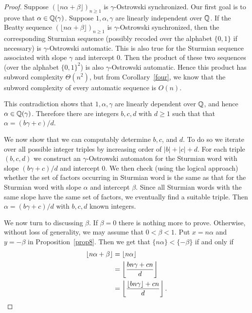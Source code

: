 \documentclass[12pt,reqno]{article}
\begin{document}
\begin{proof}
Suppose 
  $(\lfloor n \alpha + \beta \rfloor)_{n \geq 1}$ is $\gamma$-Ostrowski synchronized.
Our first goal is to prove that $\alpha \in \mathbb{Q}(\gamma)$.
Suppose $1,\alpha,\gamma$ are
linearly independent over $\mathbb{Q}$.
If the Beatty sequence
  $(\lfloor n \alpha + \beta \rfloor)_{n \geq 1}$ is $\gamma$-Ostrowski synchronized, then
the corresponding Sturmian sequence
(possibly recoded over the alphabet
$\{0,1\}$ if necessary) is $\gamma$-Ostrowski automatic.  
This is also true for the Sturmian
sequence associated with slope $\gamma$ and intercept $0$.   Then the product of these two sequences
(over the alphabet $\{0,1\}^2$)
is also $\gamma$-Ostrowski automatic.   Hence this product
has subword complexity $\Theta(n^2)$, but 
from Corollary~\ref{four},
we know that the subword complexity of every automatic sequence is $O(n)$.  

This contradiction shows that $1,\alpha,\gamma$ are linearly dependent over $\mathbb{Q}$, and hence $\alpha \in \mathbb{Q}(\gamma)$.  Therefore there are
integers $b,c,d$ with $d \geq 1$ such that that
$\alpha = (b\gamma + c)/d$.

We now show that we can computably determine $b,c$, and $d$.  To do so we iterate over all possible integer triples by increasing order of $|b|+|c|+d$.
For each triple $(b,c,d)$ we construct an $\gamma$-Ostrowski automaton for the Sturmian word with slope $(b\gamma+c)/d$ and intercept $0$.   We then check 
(using the logical approach) whether the set of factors occurring in Sturmian word is the same as that for the Sturmian word with slope $\alpha$ and intercept $\beta$.  Since all Sturmian words with the same slope have the same set of factors, we eventually find a suitable triple.  
Then $\alpha = (b\gamma+c)/d$ with $b, c, d$ known integers.  

We now turn to discussing $\beta$.
If $\beta = 0$ there is nothing more to prove.
Otherwise, without loss of generality, we may assume that
$0 < \beta < 1$.  
Put $x = n \alpha$ and $y = -\beta$ in
Proposition~\ref{prop8}.
Then we get that $\{n \alpha \} < \{-\beta \}$ if and only if
\begin{align}
\lfloor n \alpha+\beta \rfloor &= \lfloor n \alpha \rfloor \nonumber\\
&= \left\lfloor {{ bn \gamma+cn} \over d } \right\rfloor \label{gammaoa}\\
&= \left\lfloor {{ \lfloor bn \gamma \rfloor + cn} \over d} \right\rfloor .
\nonumber
\end{align}


\end{proof}
\end{document}
